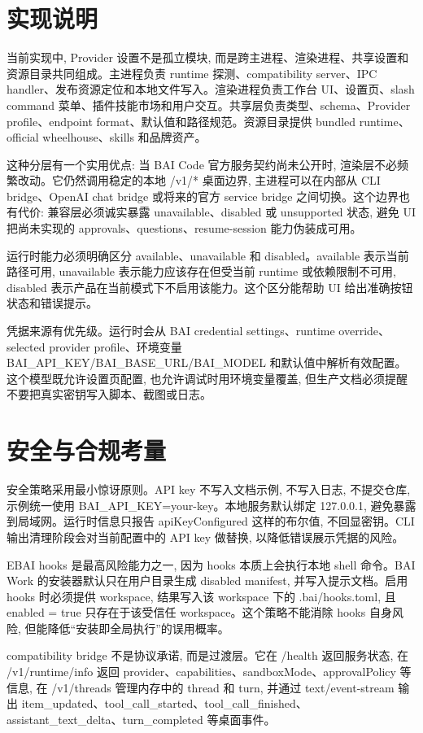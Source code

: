 \section{实现说明}
当前实现中, Provider 设置不是孤立模块, 而是跨主进程、渲染进程、共享设置和资源目录共同组成。主进程负责 runtime 探测、compatibility server、IPC handler、发布资源定位和本地文件写入。渲染进程负责工作台 UI、设置页、slash command 菜单、插件技能市场和用户交互。共享层负责类型、schema、Provider profile、endpoint format、默认值和路径规范。资源目录提供 bundled runtime、official wheelhouse、skills 和品牌资产。

这种分层有一个实用优点: 当 BAI Code 官方服务契约尚未公开时, 渲染层不必频繁改动。它仍然调用稳定的本地 /v1/* 桌面边界, 主进程可以在内部从 CLI bridge、OpenAI chat bridge 或将来的官方 service bridge 之间切换。这个边界也有代价: 兼容层必须诚实暴露 unavailable、disabled 或 unsupported 状态, 避免 UI 把尚未实现的 approvals、questions、resume-session 能力伪装成可用。

运行时能力必须明确区分 available、unavailable 和 disabled。available 表示当前路径可用, unavailable 表示能力应该存在但受当前 runtime 或依赖限制不可用, disabled 表示产品在当前模式下不启用该能力。这个区分能帮助 UI 给出准确按钮状态和错误提示。

凭据来源有优先级。运行时会从 BAI credential settings、runtime override、selected provider profile、环境变量 BAI\_API\_KEY/BAI\_BASE\_URL/BAI\_MODEL 和默认值中解析有效配置。这个模型既允许设置页配置, 也允许调试时用环境变量覆盖, 但生产文档必须提醒不要把真实密钥写入脚本、截图或日志。

\section{安全与合规考量}
安全策略采用最小惊讶原则。API key 不写入文档示例, 不写入日志, 不提交仓库, 示例统一使用 BAI\_API\_KEY=your-key。本地服务默认绑定 127.0.0.1, 避免暴露到局域网。运行时信息只报告 apiKeyConfigured 这样的布尔值, 不回显密钥。CLI 输出清理阶段会对当前配置中的 API key 做替换, 以降低错误展示凭据的风险。

EBAI hooks 是最高风险能力之一, 因为 hooks 本质上会执行本地 shell 命令。BAI Work 的安装器默认只在用户目录生成 disabled manifest, 并写入提示文档。启用 hooks 时必须提供 workspace, 结果写入该 workspace 下的 .bai/hooks.toml, 且 enabled = true 只存在于该受信任 workspace。这个策略不能消除 hooks 自身风险, 但能降低“安装即全局执行”的误用概率。

compatibility bridge 不是协议承诺, 而是过渡层。它在 /health 返回服务状态, 在 /v1/runtime/info 返回 provider、capabilities、sandboxMode、approvalPolicy 等信息, 在 /v1/threads 管理内存中的 thread 和 turn, 并通过 text/event-stream 输出 item\_updated、tool\_call\_started、tool\_call\_finished、assistant\_text\_delta、turn\_completed 等桌面事件。

